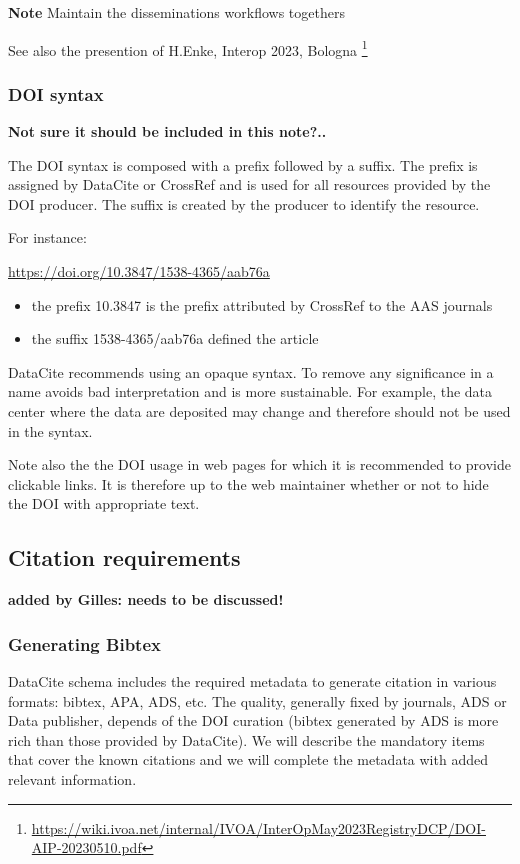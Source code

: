 \documentclass[11pt,a4paper]{ivoa}
\newcommand{\important}[1]{
	\begin{bigdescription}
		\item \color{ivoacolor}\textbf{Note} #1
	\end{bigdescription}
}
\begin{document}
\important{
Maintain the disseminations workflows togethers
}

See also the presention of H.Enke, Interop 2023, Bologna \footnote{\url{https://wiki.ivoa.net/internal/IVOA/InterOpMay2023RegistryDCP/DOI-AIP-20230510.pdf}}


\subsubsection{DOI syntax}
\textbf{\color{red} Not sure it should be included in this note?..}

The DOI syntax is composed with a prefix followed by a suffix.
The prefix is assigned by DataCite or CrossRef and is used for all resources provided by the DOI producer. The suffix is created by the producer to identify the resource.

For instance: 

\url{https://doi.org/10.3847/1538-4365/aab76a}

\begin{itemize}
	\item the prefix 10.3847 is the prefix attributed by CrossRef to the AAS journals 
	\item the suffix 1538-4365/aab76a defined the article 
\end{itemize}

DataCite recommends using an opaque syntax. To remove any significance
in a name avoids bad interpretation and is more sustainable. For example,
the data center where the data are deposited may change and therefore
should not be used in the syntax.

Note also the the DOI usage in web pages for which it is recommended to provide clickable links. It is therefore up to the web maintainer whether or not to hide the DOI with appropriate text.

\subsection{Citation requirements}
\label{sec:citation}
\textbf{\color{red} added by Gilles: needs to be discussed!}


\subsubsection{Generating Bibtex}
DataCite schema includes the required metadata to generate citation in various formats: bibtex, APA, ADS, etc. The quality, generally fixed by journals, ADS or Data publisher, depends of the DOI curation (bibtex generated by ADS is more rich than those provided by DataCite). 
We will describe the mandatory items that cover the known citations and we will complete the metadata with added relevant information.\\
\end{document}
